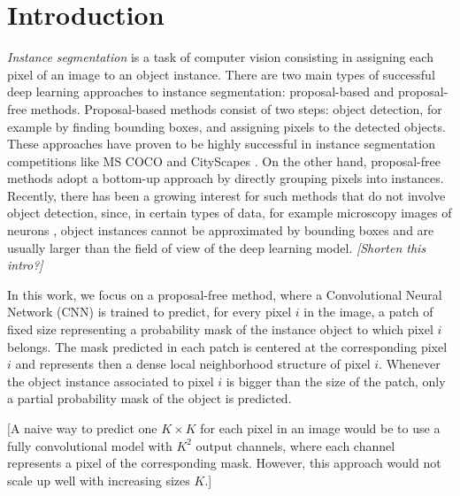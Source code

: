 
\section{Introduction}\label{sec:intro}

\emph{Instance segmentation} is a task of computer vision consisting in assigning each pixel of an image to an object instance. %
There are two main types of successful deep learning approaches to instance segmentation: proposal-based and proposal-free methods. 
Proposal-based methods consist of two steps: object detection, for example by finding bounding boxes, and assigning pixels to the detected objects. These approaches have proven to be highly successful in instance segmentation competitions like MS COCO \cite{lin2014microsoft} and CityScapes \cite{cordts2016cityscapes}. 
On the other hand, proposal-free methods adopt a bottom-up approach by directly grouping pixels into instances. Recently, there has been a growing interest for such methods that do not involve object detection, since, in certain types of data, for example microscopy images of neurons \cite{arganda2015crowdsourcing}, object instances cannot be approximated by bounding boxes and are usually larger than the field of view of the deep learning model. \emph{[Shorten this intro?]}

In this work, we focus on a proposal-free method, where a Convolutional Neural Network (CNN) is trained to predict, for every pixel $i$ in the image, a patch of fixed size representing a probability mask of the instance object to which pixel $i$ belongs. The mask predicted in each patch is centered at the corresponding pixel $i$ and represents then a dense local neighborhood structure of pixel $i$. Whenever the object instance associated to pixel $i$ is bigger than the size of the patch, only a partial probability mask of the object is predicted. 

[A naive way to predict one $K\times K$ \patch  for each pixel in an image would be to use a fully convolutional model with $K^2$ output channels, where each channel represents a pixel of the corresponding mask. However, this approach would not scale up well with increasing sizes $K$.]

